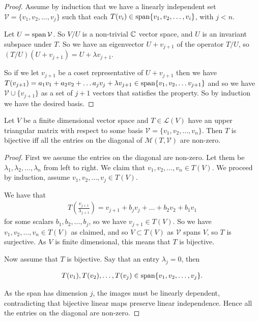 \documentclass[]{article}
\begin{document}
\begin{proof}
		Assume by induction that we have a linearly independent set $\mathcal{V} = \{v_1, v_2, \ldots, v_j\}$ such that each $T(v_i) \in \operatorname{span}\{v_1, v_2, \ldots, v_i\}$, with $j < n$. 

		Let $U = \operatorname{span} \mathcal{V}$. So $V / U$ is a non-trivial $\mathbb{C}$ vector space, and $U$ is an invariant subspace under $T$. So we have an eigenvector $U + v_{j+1}$ of the operator $T / U$, so $(T / U)(U + v_{j+1}) = U + \lambda v_{j+1}$. 

		So if we let $v_{j+1}$ be a coset representative of $U + v_{j+1}$ then we have $T(v_{j+1}) = a_1 v_1 + a_2 v_2 + \ldots a_j v_j + \lambda v_{j+1} \in \operatorname{span}\{v_1, v_2, \ldots v_{j+1}\}$ and so we have $\mathcal{V} \cup \{v_{j+1}\}$ as a set of $j + 1$ vectors that satisfies the property. So by induction we have the desired basis.
\end{proof}

\begin{thm}
		Let $V$ be a finite dimensional vector space and $T \in \mathcal{L}(V)$  have an upper triangular matrix with respect to some basis $\mathcal{V} = \{v_1, v_2, \ldots, v_n\}$. Then $T$ is bijective iff all the entries on the diagonal of $\mathcal{M}(T, \mathcal{V})$ are non-zero.
\end{thm}

\begin{proof}
		First we assume the entries on the diagonal are non-zero. Let them be $\lambda_1, \lambda_2, \ldots, \lambda_n$ from left to right. We claim that $v_1, v_2, \ldots, v_n \in T(V)$. We proceed by induction, assume $v_1, v_2, \ldots, v_j \in T(V)$. 

		We have that 
		\begin{align*}
			T(\frac{v_{j+1}}{\lambda_{j+1}}) = v_{j+1} + b_j v_j + \ldots + b_2 v_2 + b_1 v_1	
		\end{align*}
		for some scalars $b_1, b_2, \ldots, b_j$, so we have $v_{j+1} \in T(V)$. So we have $v_1, v_2, \ldots, v_n \in T(V)$ as claimed, and so $V \subset T(V)$ as $\mathcal{V}$ spans $V$, so $T$ is surjective. As $V$ is finite dimensional, this means that $T$ is bijective.

		Now assume that $T$ is bijective. Say that an entry $\lambda_j = 0$, then 

		\begin{align*}
		T(v_1), T(v_2), \ldots, T(v_j) \in \operatorname{span}\{v_1, v_2, \ldots, v_j\}. 
		\end{align*}

		As the span has dimension $j$, the images must be linearly dependent, contradicting that bijective linear maps preserve linear independence. Hence all the entries on the diagonal are non-zero.
\end{proof}
\end{document}
